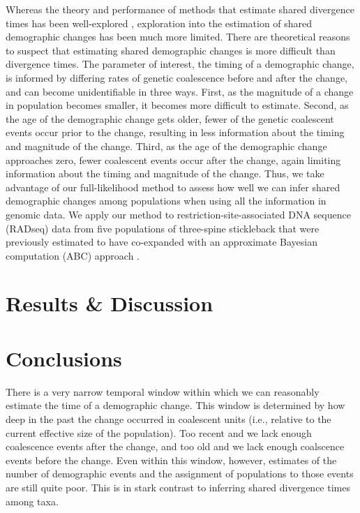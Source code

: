 Whereas the theory and performance of methods that estimate shared divergence
times has been well-explored
\citep[e.g.,][]{Oaks2012,Hickerson2013,Oaks2014reply,Oaks2014dpp,Overcast2017,Oaks2018ecoevolity},
exploration into the estimation of shared demographic changes has been much
more limited.
There are theoretical reasons to suspect that estimating shared demographic
changes is more difficult than divergence times.
The parameter of interest, the timing of a demographic change, is informed by
differing rates of genetic coalescence before and after the change, and can
become unidentifiable in three ways.
First, as the magnitude of a change in population becomes smaller,
it becomes more difficult to estimate.
Second, as the age of the demographic change gets older, fewer of the genetic
coalescent events occur prior to the change, resulting in less information
about the timing and magnitude of the change.
Third, as the age of the demographic change approaches zero, fewer coalescent
events occur after the change, again limiting information about the timing and
magnitude of the change.
Thus, we take advantage of our full-likelihood method to assess how well we can
infer shared demographic changes among populations when using all the
information in genomic data.
We apply our method to restriction-site-associated DNA sequence (RADseq) data
from five populations of three-spine stickleback
\citep[();][]{Hohenlohe2010}
that were previously estimated to have co-expanded with an approximate Bayesian
computation (ABC) approach \citep{Xue2015}.

\ifembed{

}{}


\section{Results \& Discussion}



\section{Conclusions}

There is a very narrow temporal window within which we can reasonably estimate
the time of a demographic change.
This window is determined by how deep in the past the change occurred
in coalescent units (i.e., relative to the current effective size
of the population).
Too recent and we lack enough coalescence events after the change, and too old
and we lack enough coalscence events before the change.
Even within this window, however, estimates of the number of demographic events
and the assignment of populations to those events are still quite poor.
This is in stark contrast to inferring shared divergence times among taxa.

